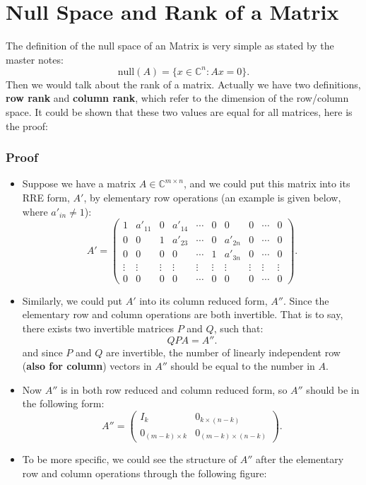 \section{Null Space and Rank of a Matrix}%
The definition of the null space of an Matrix is very simple as stated by the master notes:
\[
  \text{null}(A) = \{x \in \mathbb{C}^{n}: Ax = 0\} 
.\]
Then we would talk about the rank of a matrix. Actually we have two definitions, \textbf{row rank} and \textbf{column rank}, which refer to the dimension of the row/column space. It could be shown that these two values are equal for all matrices, here is the proof:
\subsubsection*{Proof}
\begin{itemize}
  \item Suppose we have a matrix $A \in \mathbb{C}^{m \times n}$, and we could put this matrix into its RRE form, $A'$, by elementary row operations (an example is given below, where $a'_{in} \neq 1$):
  \[
    A' = \begin{pmatrix}
    1 & a'_{11} & 0 & a'_{14} &  \cdots & 0 & 0 & 0 & \cdots & 0\\
    0 & 0 & 1 & a'_{23} & \cdots & 0& a'_{2n} & 0 & \cdots & 0\\
    0 & 0 & 0 & 0 &  \cdots & 1 & a'_{3n} & 0 & \cdots & 0\\
    \vdots & \vdots & \vdots & \vdots & \vdots &\vdots & \vdots & \vdots & \vdots & \vdots \\
    0 & 0 & 0 & 0 & \cdots & 0 & 0 & 0 & \cdots & 0
    \end{pmatrix} 
  .\]
  \item Similarly, we could put $A'$ into its column reduced form,  $A''$. Since the elementary row and column operations are both invertible. That is to say, there exists two invertible matrices  $P$ and  $Q$, such that:
   \[
  QPA = A''
  .\] 
  and since $P$ and $Q$ are invertible, the number of linearly independent row (\textbf{also for column}) vectors in  $A''$ should be equal to the number in $A$.
  \item Now $A''$ is in both row reduced and column reduced form, so $A''$ should be in the following form:
   \[
  A'' = \begin{pmatrix} 
  I_k & 0_{k \times  (n - k)} \\
  0_{(m - k) \times k} & 0_{(m - k) \times (n - k)}
  \end{pmatrix}
  .\]
  \item To be more specific, we could see the structure of $A''$ after the elementary row and column operations through the following figure:

\end{itemize}
